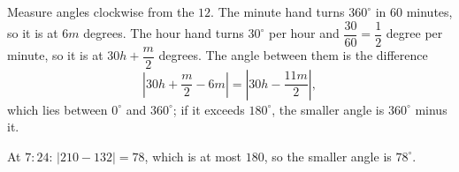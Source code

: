 Measure angles clockwise from the $12$. The minute hand turns $360^\circ$ in $60$ minutes, so it is at $6m$ degrees. The hour hand turns $30^\circ$ per hour and $\dfrac{30}{60}=\dfrac{1}{2}$ degree per minute, so it is at $30h+\dfrac {m}{2}$ degrees. The angle between them is the difference
\[
\left|30h+\dfrac {m}{2}-6m\right|=\left|30h-\dfrac{11m}{2}\right|,
\]
which lies between $0^\circ$ and $360^\circ$; if it exceeds $180^\circ$, the smaller angle is $360^\circ$ minus it.

At $7{:}24$: $|210-132|=78$, which is at most $180$, so the smaller angle is $\boxed{78^\circ}$.
